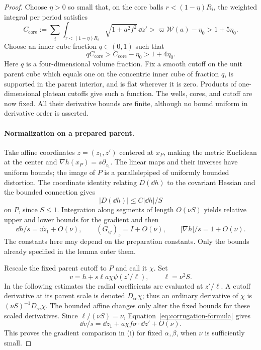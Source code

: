 \begin{proof}
Choose $\eta>0$ so small that, on the core balls
$r<(1-\eta)R_i$, the weighted integral per period satisfies
\[
 C_{\mathrm{core}}
 :=\sum_i\int_{r<(1-\eta)R_i}\sqrt{1+a^2f^2}\,\dd z'
 >\varpi\mathcal W(a)-\eta_0>1+5\eta_0.
\]
Choose an inner cube fraction $q\in(0,1)$ such that
\begin{equation}\label{eq:repeat-slack}
 qC_{\mathrm{core}}>C_{\mathrm{core}}-\eta_0>1+4\eta_0.
\end{equation}
Here $q$ is a four-dimensional volume fraction.  Fix a smooth cutoff
on the unit parent cube which equals one on the concentric inner
cube of fraction $q$, is supported in the parent interior, and is
flat wherever it is zero.  Products of one-dimensional plateau
cutoffs give such a function.  The wells, cores, and cutoff are now
fixed.  All their derivative bounds are finite, although no bound
uniform in derivative order is asserted.

\paragraph{Normalization on a prepared parent.}
Take affine coordinates $z=(z_1,z')$ centered at $x_P$, making the
metric Euclidean at the center and
$\nabla h(x_P)=s\partial_{z_1}$.  The linear maps and their inverses
have uniform bounds; the image of $P$ is a parallelepiped of uniformly
bounded distortion.  The coordinate identity relating $D(\dd h)$
to the covariant Hessian and the bounded connection gives
\[
 |D(\dd h)|\le C|\dd h|/S
\]
on $P$, since $S\le1$.  Integration along segments of length
$O(\nu S)$ yields relative upper and lower bounds for the gradient
and then
\begin{equation}\label{eq:parent-normalization}
 \dd h/s=\dd z_1+O(\nu),\qquad
 (G_{ij})_z=I+O(\nu),\qquad
 |\nabla h|/s=1+O(\nu).
\end{equation}
The constants here may depend on the preparation constants.  Only
the bounds already specified in the lemma enter them.

Rescale the fixed parent cutoff to $P$ and call it $\chi$.  Set
\begin{equation}\label{eq:corrugation-formula}
 v=h+s\ell a\chi\psi(z'/\ell),\qquad \ell=\nu^2S.
\end{equation}
In the following estimates the radial coefficients are evaluated at
$z'/\ell$.  A cutoff derivative at its parent scale is denoted
$D_{\mathrm{sc}}\chi$; thus an ordinary derivative of $\chi$ is
$(\nu S)^{-1}D_{\mathrm{sc}}\chi$.  The bounded affine changes only
alter the fixed bounds for these scaled derivatives.  Since
$\ell/(\nu S)=\nu$, Equation~\eqref{eq:corrugation-formula} gives
\begin{equation}\label{eq:new-gradient}
 \dd v/s=\dd z_1+a\chi f\sigma\cdot\dd z'+O(\nu).
\end{equation}
This proves the gradient comparison in \textup{(i)} for fixed
$\alpha,\beta$, when $\nu$ is sufficiently small.


\end{proof}

